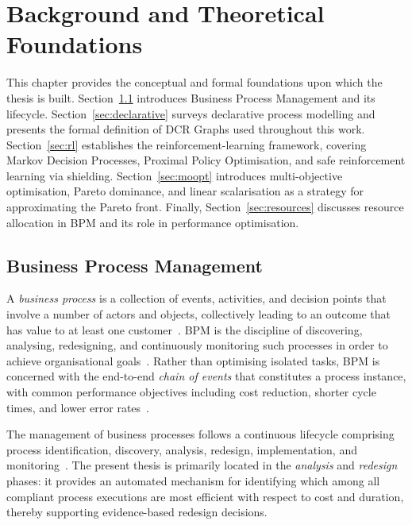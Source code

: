 
\chapter{Background and Theoretical Foundations}
\label{chap:background}

This chapter provides the conceptual and formal foundations upon which the
thesis is built.  Section~\ref{sec:bpm} introduces Business Process Management
and its lifecycle.  Section~\ref{sec:declarative} surveys declarative process
modelling and presents the formal definition of DCR Graphs used throughout this
work.  Section~\ref{sec:rl} establishes the reinforcement-learning framework,
covering Markov Decision Processes, Proximal Policy Optimisation, and safe
reinforcement learning via shielding.
Section~\ref{sec:moopt} introduces multi-objective optimisation, Pareto
dominance, and linear scalarisation as a strategy for approximating the Pareto
front.  Finally, Section~\ref{sec:resources} discusses resource allocation in
BPM and its role in performance optimisation.

\section{Business Process Management}
\label{sec:bpm}

A \emph{business process} is a collection of events, activities, and decision
points that involve a number of actors and objects, collectively leading to an
outcome that has value to at least one
customer~\cite{Dumas2018FundamentalsManagement}.  \ac{BPM} is the discipline of discovering, analysing, redesigning, and
continuously monitoring such processes in order to achieve organisational
goals~\cite{Dumas2018FundamentalsManagement}.  Rather than optimising isolated
tasks, BPM is concerned with the end-to-end \emph{chain of events} that
constitutes a process instance, with common performance objectives including
cost reduction, shorter cycle times, and lower error
rates~\cite{Huang2011ReinforcementManagement}.

The management of business processes follows a continuous lifecycle comprising
process identification, discovery, analysis, redesign, implementation, and
monitoring~\cite{Dumas2018FundamentalsManagement}.  The present thesis is
primarily located in the \emph{analysis} and \emph{redesign} phases: it
provides an automated mechanism for identifying which among all compliant
process executions are most efficient with respect to cost and duration,
thereby supporting evidence-based redesign decisions.

